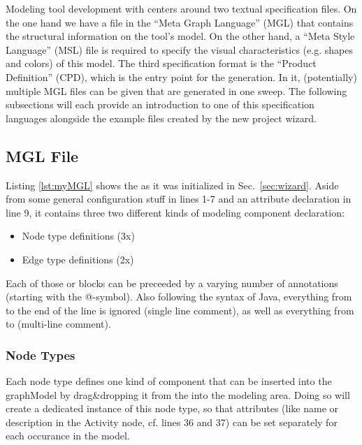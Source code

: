 \documentclass[a4paper,american,12pt]{scrreprt}
\begin{document}
Modeling tool development with \cinco centers around two textual specification
files. On the one hand we have a file in the ``Meta Graph Language'' (MGL) that
contains the structural information on the tool's model. On the other hand, a
``Meta Style Language'' (MSL) file\footnotemark{} is required to specify the
visual characteristics (e.g.  shapes and colors) of this model. The third
specification format is the ``\cinco Product Definition'' (CPD), which is the
entry point for the generation. In it, (potentially) multiple MGL files can be
given that are generated in one sweep. The following
subsections will each provide an introduction to one of this specification
languages alongside the example files created by the new project wizard.


\subsection{MGL File} \label{sec:mgl} 


Listing \ref{lst:myMGL} shows the  as it was initialized in
Sec.~\ref{sec:wizard}. Aside from some general configuration stuff in lines
1-7 and an attribute declaration in line 9, it contains three two different kinds of modeling component declaration:
\begin{itemize}
\item Node type definitions (3x)
\item Edge type definitions (2x)
\end{itemize}

Each of those   or   blocks can be preceeded
by a varying number of annotations (starting with the @-symbol). Also following
the syntax of Java, everything from \code{//} to the end of the line is ignored
(single line comment), as well as everything from \code{/*} to \code{*/}
(multi-line comment).

\subsubsection{Node Types}

Each node type defines one kind of component that can be inserted into the
graphModel by drag\&dropping it from the  into the modeling area.
Doing so will create a dedicated instance of this node type, so that attributes
(like name or description in the Activity node, cf. lines 36 and 37) can be set
separately for each occurance in the model.
\end{document}
